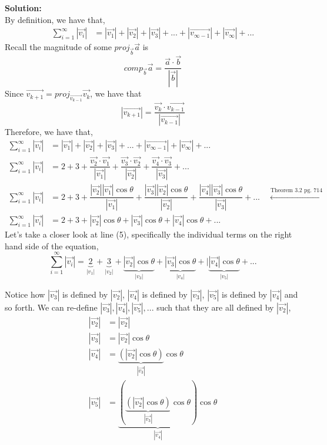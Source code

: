 \documentclass[12pt]{book}
\begin{document}
\begin{enumerate}
\textbf{Solution:}\\
By definition, we have that,
\begin{align}
    \sum\limits_{i=1}^{\infty} |\vec{v_i}| &= |\vec{v_1}| + |\vec{v_2}| + |\vec{v_3}| + ... + |\vec{v_{\infty-1}}| + |\vec{v_\infty}| + ...
\end{align}
Recall the magnitude of some $proj_{\vec{b}}\vec{a}$ is $$comp_{\vec{b}}\vec{a} = \dfrac{\vec{a} \cdot \vec{b}}{|\vec{b}|}$$
Since $\vec{v_{k+1}} = proj_{\vec{v_{k-1}}}\vec{v_k}$, we have that $$|\vec{v_{k+1}}| = \dfrac{\vec{v_k} \cdot \vec{v_{k-1}}}{|\vec{v_{k-1}}|}$$
Therefore, we have that,
\begin{align}
    \sum\limits_{i=1}^{\infty} |\vec{v_i}| &= |\vec{v_1}| + |\vec{v_2}| + |\vec{v_3}| + ... + |\vec{v_{\infty-1}}| + |\vec{v_\infty}| + ... \\
    \sum\limits_{i=1}^{\infty} |\vec{v_i}| &= 2 + 3 + \dfrac{\vec{v_2} \cdot \vec{v_{1}}}{|\vec{v_{1}}|} + \dfrac{\vec{v_3} \cdot \vec{v_{2}}}{|\vec{v_{2}}|} + \dfrac{\vec{v_4} \cdot \vec{v_{3}}}{|\vec{v_{3}}|} + ... \\
    \sum\limits_{i=1}^{\infty} |\vec{v_i}| &= 2 + 3 + \dfrac{|\vec{v_2}||\vec{v_1}|\cos\theta}{|\vec{v_{1}}|} + \dfrac{|\vec{v_3}||\vec{v_2}|\cos\theta}{|\vec{v_{2}}|} + \dfrac{|\vec{v_4}||\vec{v_3}|\cos\theta}{|\vec{v_{3}}|} + ... \quad \xleftarrow[]{\text{Theorem 3.2 pg. 714}} \\
    \sum\limits_{i=1}^{\infty} |\vec{v_i}| &= 2 + 3 + |\vec{v_2}|\cos\theta + |\vec{v_3}|\cos\theta + |\vec{v_4}|\cos\theta + ...
\end{align}
Let's take a closer look at line (5), specifically the individual terms on the right hand side of the equation,
$$\sum\limits_{i=1}^{\infty} |\vec{v_i}| = \underbrace{2}_{|v_1|} + \underbrace{3}_{|v_2|} + \underbrace{|\vec{v_2}|\cos\theta}_{|v_3|} +  \underbrace{|\vec{v_3}|\cos\theta}_{|v_4|} + | \underbrace{|\vec{v_4}|\cos\theta}_{|v_5|} + ...$$

Notice how $|\vec{v_3}|$ is defined by $|\vec{v_2}|$, $|\vec{v_4}|$ is defined by $|\vec{v_3}|$, $|\vec{v_5}|$ is defined by $|\vec{v_4}|$ and so forth. We can re-define $|\vec{v_3}|, |\vec{v_4}|, |\vec{v_5}|,... $ such that they are all defined by $|\vec{v_2}|$,
\begingroup
\addtolength{\jot}{0.8em}
\begin{align}
    |\vec{v_2}| &= |\vec{v_2}| \\
    |\vec{v_3}| &= |\vec{v_2}|\cos\theta \\
    |\vec{v_4}| &= \underbrace{\left(|\vec{v_2}|\cos\theta\right)}_{|\vec{v_3}|}\cos\theta \\
    |\vec{v_5}| &= \underbrace{\left(\underbrace{\left(|\vec{v_2}|\cos\theta\right)}_{|\vec{v_3}|}\cos\theta\right)}_{|\vec{v_4}|}\cos\theta
\end{align}
\endgroup


\end{enumerate}
\end{document}
